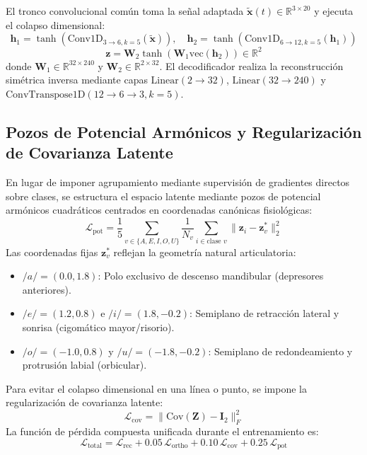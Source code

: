 \documentclass[11pt,a4paper,openany]{book}
\theoremstyle{definition}
\begin{document}
El tronco convolucional común toma la señal adaptada $\tilde{\mathbf{x}}(t) \in \mathbb{R}^{3 \times 20}$ y ejecuta el colapso dimensional:
\begin{equation}
    \mathbf{h}_1 = \tanh(\text{Conv1D}_{3 \to 6, k=5}(\tilde{\mathbf{x}})), \quad \mathbf{h}_2 = \tanh(\text{Conv1D}_{6 \to 12, k=5}(\mathbf{h}_1))
\end{equation}
\begin{equation}
    \mathbf{z} = \mathbf{W}_2 \tanh(\mathbf{W}_1 \text{vec}(\mathbf{h}_2)) \in \mathbb{R}^2
\end{equation}
donde $\mathbf{W}_1 \in \mathbb{R}^{32 \times 240}$ y $\mathbf{W}_2 \in \mathbb{R}^{2 \times 32}$. El decodificador realiza la reconstrucción simétrica inversa mediante capas $\text{Linear}(2 \to 32)$, $\text{Linear}(32 \to 240)$ y $\text{ConvTranspose1D}(12 \to 6 \to 3, k=5)$.

\subsection{Pozos de Potencial Armónicos y Regularización de Covarianza Latente}
\label{subsec:pozos_armonicos_geometria}

En lugar de imponer agrupamiento mediante supervisión de gradientes directos sobre clases, se estructura el espacio latente mediante pozos de potencial armónicos cuadráticos centrados en coordenadas canónicas fisiológicas:
\begin{equation}
    \mathcal{L}_{\text{pot}} = \frac{1}{5} \sum_{v \in \{A,E,I,O,U\}} \frac{1}{N_v} \sum_{i \in \text{clase } v} \|\mathbf{z}_i - \mathbf{z}_v^*\|_2^2
\end{equation}
Las coordenadas fijas $\mathbf{z}_v^*$ reflejan la geometría natural articulatoria:
\begin{itemize}
    \item $/a/ = (0.0, 1.8)$: Polo exclusivo de descenso mandibular (depresores anteriores).
    \item $/e/ = (1.2, 0.8)$ e $/i/ = (1.8, -0.2)$: Semiplano de retracción lateral y sonrisa (cigomático mayor/risorio).
    \item $/o/ = (-1.0, 0.8)$ y $/u/ = (-1.8, -0.2)$: Semiplano de redondeamiento y protrusión labial (orbicular).
\end{itemize}
Para evitar el colapso dimensional en una línea o punto, se impone la regularización de covarianza latente:
\begin{equation}
    \mathcal{L}_{\text{cov}} = \|\text{Cov}(\mathbf{Z}) - \mathbf{I}_2\|_F^2
\end{equation}
La función de pérdida compuesta unificada durante el entrenamiento es:
\begin{equation}
    \mathcal{L}_{\text{total}} = \mathcal{L}_{\text{rec}} + 0.05\,\mathcal{L}_{\text{ortho}} + 0.10\,\mathcal{L}_{\text{cov}} + 0.25\,\mathcal{L}_{\text{pot}}
\end{equation}
\end{document}
